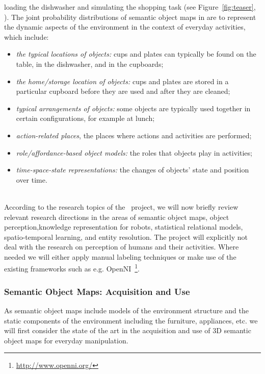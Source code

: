 loading  the  dishwasher and simulating the shopping task (see Figure~\ref{fig:teaser}, ).
The joint probability distributions of semantic object maps in \ksem are to represent the
dynamic aspects of the environment in the context of everyday
activities, which include:
\begin{itemize}
\item \emph{the typical locations of objects:} cups and plates can
  typically be found on the table, in the dishwasher, and in the
  cupboards;
\item \emph{the home/storage location of objects:} cups and plates are
  stored in a particular cupboard before they are used and after they
  are cleaned;
\item \emph{typical arrangements of objects:} some objects are
  typically used together in certain configurations, for example
  at lunch; %
\item \emph{action-related places}, the places where actions and
  activities are performed;
\item \emph{role/affordance-based object models:} the roles that
  objects play in activities;
\item \emph{time-space-state representations:} the changes of
  objects' state and position over time.
\end{itemize}

\\
According to the research topics of the \ksem\ project, we will now
briefly review relevant research directions in the areas of semantic
object maps, object perception,knowledge representation for robots, statistical relational models,
spatio-temporal learning, and entity resolution. The project will
explicitly not deal with the research on perception of humans and their activities.
Where needed we will either apply manual labeling techniques or make use 
of the existing frameworks such as e.g. OpenNI~\footnote{\url{http://www.openni.org/}}.
\subsubsection{Semantic Object Maps: Acquisition and Use}
\label{sec:soms}
As semantic object maps include models of the environment structure and the static
components of the environment including the furniture, appliances,
etc. we will first consider the state of the art in the acquisition
and use of 3D semantic object maps for everyday manipulation.

